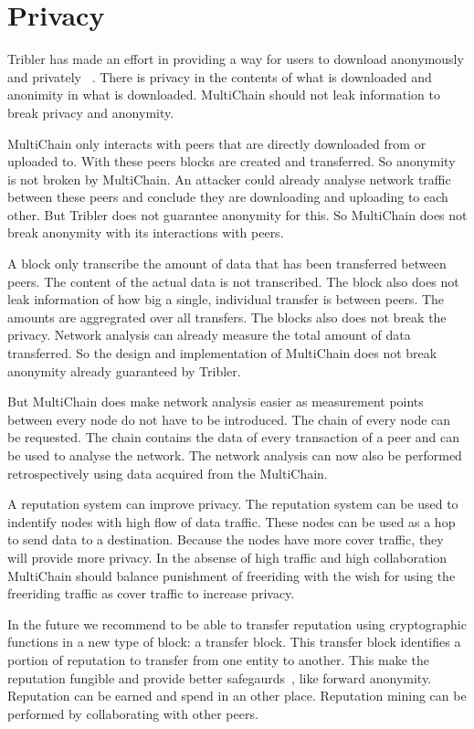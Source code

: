 \section{Privacy}
Tribler has made an effort in providing a way for users to download anonymously and privately
~\cite{Plak-anonymous,ruigrok-anonymous,tanaskoski-anonymous}.
There is privacy in the contents of what is downloaded and anonimity in what is downloaded.
MultiChain should not leak information to break privacy and anonymity.

MultiChain only interacts with peers that are directly downloaded from or uploaded to.
With these peers blocks are created and transferred.
So anonymity is not broken by MultiChain.
An attacker could already analyse network traffic between these peers
and conclude they are downloading and uploading to each other.
But Tribler does not guarantee anonymity for this.
So MultiChain does not break anonymity with its interactions with peers.

A block only transcribe the amount of data that has been transferred between peers.
The content of the actual data is not transcribed.
The block also does not leak information of how big a single, individual transfer is between peers.
The amounts are aggregrated over all transfers.
The blocks also does not break the privacy.
Network analysis can already measure the total amount of data transferred.
So the design and implementation of MultiChain does not break anonymity already guaranteed by Tribler.

But MultiChain does make network analysis easier as measurement points between every node do not have to be introduced.
The chain of every node can be requested.
The chain contains the data of every transaction of a peer and can be used to analyse the network.
The network analysis can now also be performed retrospectively using data acquired from the MultiChain.

A reputation system can improve privacy.
The reputation system can be used to indentify nodes with high flow of data traffic.
These nodes can be used as a hop to send data to a destination.
Because the nodes have more cover traffic, they will provide more privacy\cite{acquisti-economics}.
In the absense of high traffic and high collaboration MultiChain should balance punishment of freeriding
with the wish for using the freeriding traffic as cover traffic to increase privacy\cite{dingledine-reputation}.

In the future we recommend to be able to transfer reputation using cryptographic functions in a new type of block: a transfer block.
This transfer block identifies a portion of reputation to transfer from one entity to another.
This make the reputation fungible and provide better safegaurds~\cite{acquisti-economics}, like forward anonymity.
Reputation can be earned and spend in an other place.
Reputation mining can be performed by collaborating with other peers.


